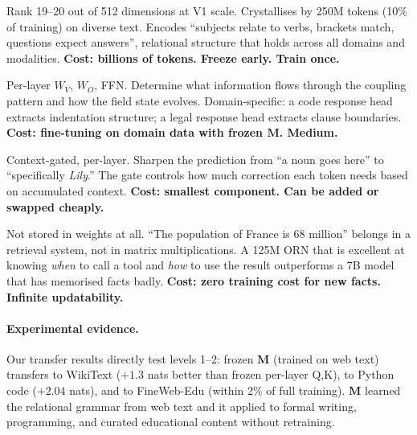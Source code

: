 \documentclass[11pt, a4paper]{article}
\newcommand{\M}{\mathbf{M}}
\theoremstyle{plain}
\theoremstyle{remark}
\begin{document}
\begin{description}[nosep, leftmargin=1.5em]
    \item[1. Coupling geometry ($\M$), the grammar of relations.]
    Rank 19--20 out of 512 dimensions at V1 scale.
    Crystallises by 250M tokens (10\% of training) on diverse text.
    Encodes ``subjects relate to verbs, brackets match, questions expect answers'', relational structure that holds across all domains and modalities.
    \textbf{Cost: billions of tokens. Freeze early. Train once.}

    \item[2. Response heads, domain skills.]
    Per-layer $W_V$, $W_O$, FFN.
    Determine what information flows through the coupling pattern and how the field state evolves.
    Domain-specific: a code response head extracts indentation structure; a legal response head extracts clause boundaries.
    \textbf{Cost: fine-tuning on domain data with frozen $\M$. Medium.}

    \item[3. Perturbative corrections, instance-specific detail.]
    Context-gated, per-layer.
    Sharpen the prediction from ``a noun goes here'' to ``specifically \emph{Lily}.''
    The gate controls how much correction each token needs based on accumulated context.
    \textbf{Cost: smallest component. Can be added or swapped cheaply.}

    \item[4. Tool calling, factual lookup.]
    Not stored in weights at all.
    ``The population of France is 68 million'' belongs in a retrieval system, not in matrix multiplications.
    A 125M ORN that is excellent at knowing \emph{when} to call a tool and \emph{how} to use the result outperforms a 7B model that has memorised facts badly.
    \textbf{Cost: zero training cost for new facts. Infinite updatability.}
\end{description}

\paragraph{Experimental evidence.}
Our transfer results directly test levels 1--2: frozen $\M$ (trained on web text) transfers to WikiText ($+1.3$ nats better than frozen per-layer Q,K), to Python code ($+2.04$ nats), and to FineWeb-Edu (within 2\% of full training).
$\M$ learned the relational grammar from web text and it applied to formal writing, programming, and curated educational content without retraining.
\end{document}
